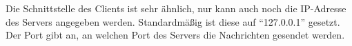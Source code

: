 \documentclass[a4paper,oneside,10pt]{report}
\begin{document}
Die Schnittstelle des Clients ist sehr ähnlich, nur kann auch noch die IP-Adresse des Servers angegeben werden. Standardmäßig ist diese auf "`127.0.0.1"' gesetzt. Der Port gibt an, an welchen Port des Servers die Nachrichten gesendet werden.







\end{document}
